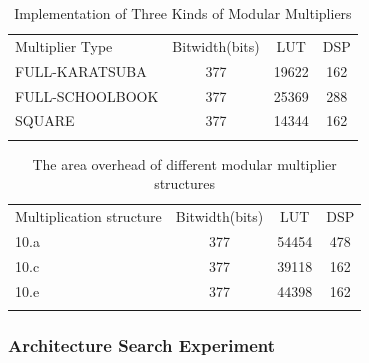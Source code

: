 \documentclass[conference]{IEEEtran}
\begin{document}
\begin{table}[]
    \centering
    \caption{Implementation of Three Kinds of Modular Multipliers}
    \renewcommand{\arraystretch}{1.5}
    \begin{tabular}{l|c|c|c}
                \Xhline{1.5pt}
                Multiplier Type    & Bitwidth(bits)   & LUT   & DSP  \\
                \Xhline{1pt}
                FULL-KARATSUBA                            & 377       & 19622 & 162  \\ 
                \Xhline{1pt}
                FULL-SCHOOLBOOK                            & 377       & 25369 & 288  \\ 
                \Xhline{1pt}
                SQUARE                            & 377       & 14344 & 162  \\ 
                \Xhline{1.5pt}    
    \end{tabular}
    \label{377bits-VU9P-Three modular multipliers}
\end{table}

\begin{table}[]
    \centering
    \caption{The area overhead of different modular multiplier structures}
    \renewcommand{\arraystretch}{1.5}
    \begin{tabular}{l|c|c|c}
                \Xhline{1.5pt}
                Multiplication structure    &  Bitwidth(bits)           &    LUT        &    DSP    \\
                \Xhline{1pt}
                10.a                      &  377       &   54454            &       478    \\ 
                \Xhline{1pt}
                10.c                      &  377       &    39118      &   162      \\ 
                \Xhline{1pt}
                10.e                      &  377       &    44398      &   162    \\ 
                \Xhline{1.5pt}    
    \end{tabular}
    \label{The area overhead of different modular multiplier structures}
\end{table}



\subsubsection{Architecture Search Experiment}
\end{document}
